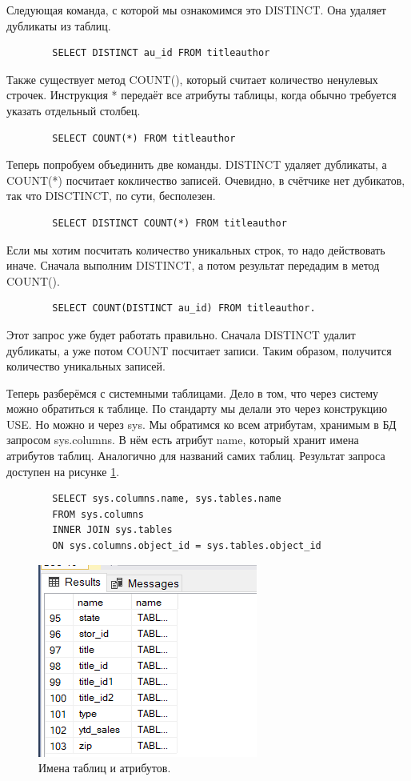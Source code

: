 Следующая команда, с которой мы ознакомимся это DISTINCT. Она удаляет дубликаты из таблиц.

\begin{verbatim}
        SELECT DISTINCT au_id FROM titleauthor
\end{verbatim}

Также существует метод COUNT(), который считает количество ненулевых строчек. Инструкция * передаёт все атрибуты таблицы, когда обычно требуется указать отдельный столбец.

\begin{verbatim}
        SELECT COUNT(*) FROM titleauthor
\end{verbatim}

Теперь попробуем объединить две команды. DISTINCT удаляет дубликаты, а COUNT(*) посчитает кокличество записей. Очевидно, в счётчике нет дубикатов, так что DISCTINCT, по сути, бесполезен.
\begin{verbatim}
        SELECT DISTINCT COUNT(*) FROM titleauthor
\end{verbatim}

Если мы хотим посчитать количество уникальных строк, то надо действовать иначе. Сначала выполним DISTINCT, а потом результат передадим в метод COUNT().

\begin{verbatim}
        SELECT COUNT(DISTINCT au_id) FROM titleauthor.
\end{verbatim}

Этот запрос уже будет работать правильно. Сначала DISTINCT удалит дубликаты, а уже потом COUNT посчитает записи. Таким образом, получится количество уникальных записей.

Теперь разберёмся с системными таблицами. Дело в том, что через систему можно обратиться к таблице. По стандарту мы делали это через конструкцию USE. Но можно и через sys. Мы обратимся ко всем атрибутам, хранимым в БД запросом sys.columns. В нём есть атрибут name, который хранит имена атрибутов таблиц. Аналогично для названий самих таблиц. Результат запроса доступен на рисунке \ref{fig:SYSNAMEATR}. 

\begin{verbatim}
        SELECT sys.columns.name, sys.tables.name 
        FROM sys.columns
        INNER JOIN sys.tables
        ON sys.columns.object_id = sys.tables.object_id
\end{verbatim}

\begin{figure}[h!]
    \centering
    \includegraphics[width=0.3\linewidth]{Pic/lab4/SQ13.PNG}
    \caption{Имена таблиц и атрибутов.}
    \label{fig:SYSNAMEATR}
\end{figure}

